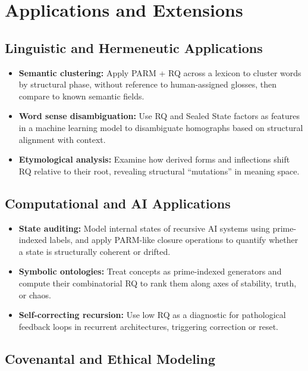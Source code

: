 \documentclass[11pt]{article}
\begin{document}
\section{Applications and Extensions}

\subsection{Linguistic and Hermeneutic Applications}

\begin{itemize}
    \item \textbf{Semantic clustering:} Apply PARM + RQ across a lexicon to cluster words by structural phase, without reference to human-assigned glosses, then compare to known semantic fields.
    \item \textbf{Word sense disambiguation:} Use RQ and Sealed State factors as features in a machine learning model to disambiguate homographs based on structural alignment with context.
    \item \textbf{Etymological analysis:} Examine how derived forms and inflections shift RQ relative to their root, revealing structural ``mutations'' in meaning space.
\end{itemize}

\subsection{Computational and AI Applications}

\begin{itemize}
    \item \textbf{State auditing:} Model internal states of recursive AI systems using prime-indexed labels, and apply PARM-like closure operations to quantify whether a state is structurally coherent or drifted.\cite{primeindexing,thresholdrecursion}
    \item \textbf{Symbolic ontologies:} Treat concepts as prime-indexed generators and compute their combinatorial RQ to rank them along axes of stability, truth, or chaos.
    \item \textbf{Self-correcting recursion:} Use low RQ as a diagnostic for pathological feedback loops in recurrent architectures, triggering correction or reset.
\end{itemize}

\subsection{Covenantal and Ethical Modeling}
\end{document}
